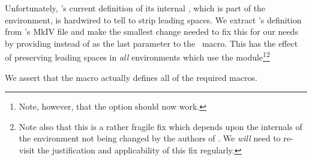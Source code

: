 
\startMkIVCode
\unexpanded{}

\unexpanded{}

\unexpanded{}

\unexpanded{}

\unexpanded{}

\unexpanded{}
\stopMkIVCode

Unfortunately, \ConTeXt's current definition of its internal 
, which is part of the 
 environment, is hardwired to tell  
to strip leading spaces. We extract 's 
definition from \ConTeXt's MkIV file  and make the 
smallest change needed to fix this for our needs by providing 
\type{\zerocount} instead of \type{\plusone} as the last parameter to the 
 \ConTeXt\ macro. This has the effect of preserving 
leading spaces in \emph{all}  environments which use 
the  module\footnote{Note, however, that the 
\type{\setuptyping}  option should now work.}\footnote{Note 
also that this is a rather fragile fix which depends upon the internals of 
the  environment not being changed by the authors of 
\ConTeXt. We \emph{will} need to re-visit the justification and 
applicability of this fix regularly.} 

\startMkIVCode
\unexpanded{}
\stopMkIVCode


We assert that the  macro actually defines all of 
the required macros. 

